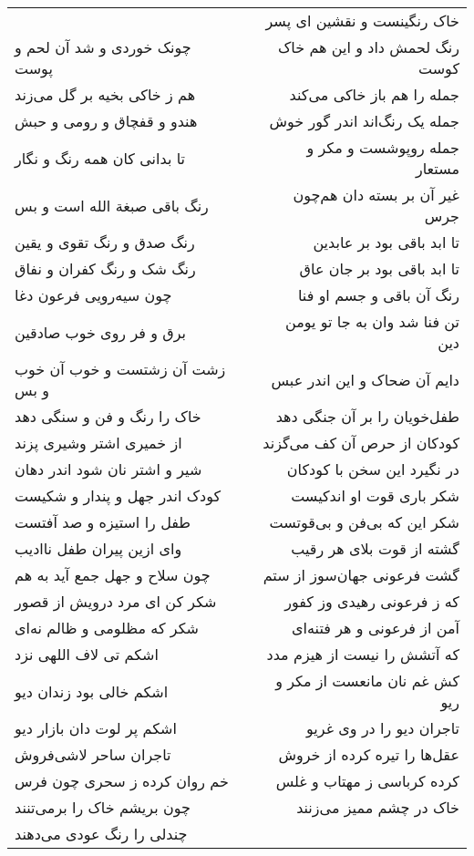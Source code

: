 \begin{center}
\begin{longtable}{l p{0.5cm} r}
&&
خاک رنگینست و نقشین ای پسر
\\
چونک خوردی و شد آن لحم و پوست
&&
رنگ لحمش داد و این هم خاک کوست
\\
هم ز خاکی بخیه بر گل می‌زند
&&
جمله را هم باز خاکی می‌کند
\\
هندو و قفچاق و رومی و حبش
&&
جمله یک رنگ‌اند اندر گور خوش
\\
تا بدانی کان همه رنگ و نگار
&&
جمله روپوشست و مکر و مستعار
\\
رنگ باقی صبغة الله است و بس
&&
غیر آن بر بسته دان هم‌چون جرس
\\
رنگ صدق و رنگ تقوی و یقین
&&
تا ابد باقی بود بر عابدین
\\
رنگ شک و رنگ کفران و نفاق
&&
تا ابد باقی بود بر جان عاق
\\
چون سیه‌رویی فرعون دغا
&&
رنگ آن باقی و جسم او فنا
\\
برق و فر روی خوب صادقین
&&
تن فنا شد وان به جا تو یومن دین
\\
زشت آن زشتست و خوب آن خوب و بس
&&
دایم آن ضحاک و این اندر عبس
\\
خاک را رنگ و فن و سنگی دهد
&&
طفل‌خویان را بر آن جنگی دهد
\\
از خمیری اشتر وشیری پزند
&&
کودکان از حرص آن کف می‌گزند
\\
شیر و اشتر نان شود اندر دهان
&&
در نگیرد این سخن با کودکان
\\
کودک اندر جهل و پندار و شکیست
&&
شکر باری قوت او اندکیست
\\
طفل را استیزه و صد آفتست
&&
شکر این که بی‌فن و بی‌قوتست
\\
وای ازین پیران طفل ناادیب
&&
گشته از قوت بلای هر رقیب
\\
چون سلاح و جهل جمع آید به هم
&&
گشت فرعونی جهان‌سوز از ستم
\\
شکر کن ای مرد درویش از قصور
&&
که ز فرعونی رهیدی وز کفور
\\
شکر که مظلومی و ظالم نه‌ای
&&
آمن از فرعونی و هر فتنه‌ای
\\
اشکم تی لاف اللهی نزد
&&
که آتشش را نیست از هیزم مدد
\\
اشکم خالی بود زندان دیو
&&
کش غم نان مانعست از مکر و ریو
\\
اشکم پر لوت دان بازار دیو
&&
تاجران دیو را در وی غریو
\\
تاجران ساحر لاشی‌فروش
&&
عقل‌ها را تیره کرده از خروش
\\
خم روان کرده ز سحری چون فرس
&&
کرده کرباسی ز مهتاب و غلس
\\
چون بریشم خاک را برمی‌تنند
&&
خاک در چشم ممیز می‌زنند
\\
چندلی را رنگ عودی می‌دهند
&&

\end{longtable}
\end{center}

